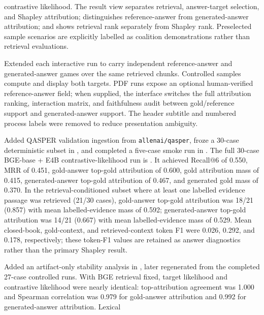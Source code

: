 \begin{description}
  contrastive likelihood. The result view separates retrieval, answer-target
  selection, and Shapley attribution; distinguishes reference-answer from
  generated-answer attribution; and shows retrieval rank separately from
  Shapley rank. Preselected sample scenarios are explicitly labelled as
  coalition demonstrations rather than retrieval evaluations.
  \item[2026-06-14, dual-target interface] Extended each interactive run to
  carry independent reference-answer and generated-answer games over the same
  retrieved chunks. Controlled samples compute and display both targets. PDF
  runs expose an optional human-verified reference-answer field; when supplied,
  the interface switches the full attribution ranking, interaction matrix, and
  faithfulness audit between gold/reference support and generated-answer
  support. The header subtitle and numbered process labels were removed to
  reduce presentation ambiguity.
  \item[2026-06-15--16, QASPER external validation] Added QASPER validation
  ingestion from \texttt{allenai/qasper}, froze a 30-case deterministic subset
  in , and completed a five-case
  smoke run in
  . The full
  30-case BGE-base + E4B contrastive-likelihood run is
  . It achieved
  Recall@6 of 0.550, MRR of 0.451, gold-answer top-gold attribution of 0.600,
  gold attribution mass of 0.415, generated-answer top-gold attribution of
  0.467, and generated gold mass of 0.370. In the retrieval-conditioned subset
  where at least one labelled evidence passage was retrieved (21/30 cases),
  gold-answer top-gold attribution was 18/21 (0.857) with mean labelled-evidence
  mass of 0.592; generated-answer top-gold attribution was 14/21 (0.667) with
  mean labelled-evidence mass of 0.529. Mean closed-book, gold-context, and
  retrieved-context token F1 were 0.026, 0.292, and 0.178, respectively; these
  token-F1 values are retained as answer diagnostics rather than the primary
  Shapley result.
  \item[2026-06-16, controlled stability analysis] Added an artifact-only
  stability analysis in , later
  regenerated from the completed 27-case controlled runs. With BGE retrieval
  fixed, target likelihood and contrastive likelihood were nearly identical:
  top-attribution agreement was 1.000 and Spearman correlation was 0.979 for
  gold-answer attribution and 0.992 for generated-answer attribution. Lexical

\end{description}
